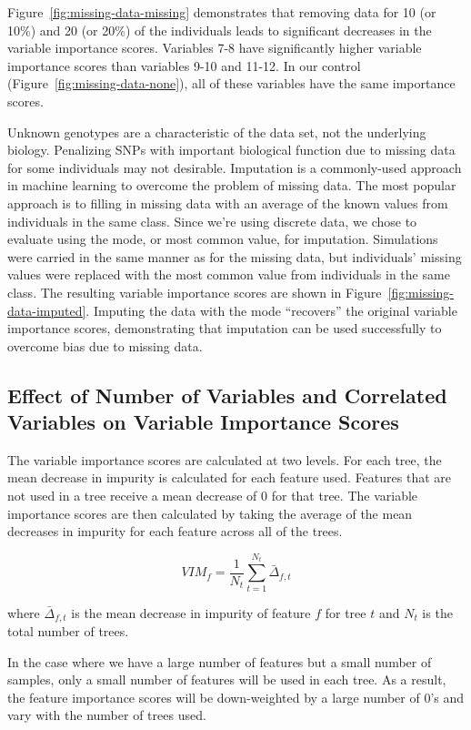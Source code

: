 Figure~\ref{fig:missing-data-missing} demonstrates that removing data for 10 (or 10\%) and 20 (or 20\%) of the individuals leads to significant decreases in the variable importance scores.  Variables 7-8 have significantly higher variable importance scores than variables 9-10 and 11-12. In our control (Figure~\ref{fig:missing-data-none}), all of these variables have the same importance scores.

Unknown genotypes are a characteristic of the data set, not the underlying biology.  Penalizing SNPs with important biological function due to missing data for some individuals may not desirable. Imputation is a commonly-used approach in machine learning to overcome the problem of missing data.  The most popular approach is to filling in missing data with an average of the known values from individuals in the same class.  Since we're using discrete data, we chose to evaluate using the mode, or most common value, for imputation.  Simulations were carried in the same manner as for the missing data, but individuals' missing values were replaced with the most common value from individuals in the same class.  The resulting variable importance scores are shown in Figure~\ref{fig:missing-data-imputed}.  Imputing the data with the mode ``recovers'' the original variable importance scores, demonstrating that imputation can be used successfully to overcome bias due to missing data.

\subsection{Effect of Number of Variables and Correlated Variables on Variable Importance Scores} \label{sec:correlated}
The variable importance scores are calculated at two levels.  For each tree, the mean decrease in impurity is calculated for each feature used.  Features that are not used in a tree receive a mean decrease of 0 for that tree.  The variable importance scores are then calculated by taking the average of the mean decreases in impurity for each feature across all of the trees.

\[
VIM_f = \frac {1} {N_t} \sum_{t=1}^{N_t} \bar{\Delta}_{f, t}
\]

where $\bar{\Delta}_{f, t}$ is the mean decrease in impurity of feature $f$ for tree $t$ and $N_t$ is the total number of trees.

In the case where we have a large number of features but a small number of samples, only a small number of features will be used in each tree.  As a result, the feature importance scores will be down-weighted by a large number of 0's and vary with the number of trees used.


